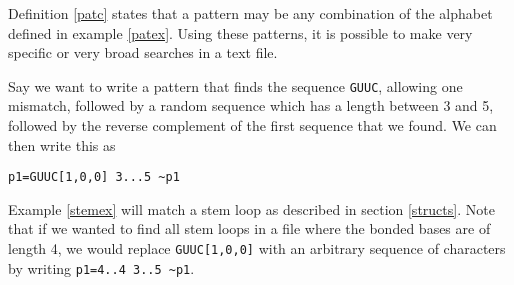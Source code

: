 Definition \ref{patc} states that a pattern may be any combination of the alphabet 
defined in example \ref{patex}.
Using these patterns, it is possible to make very specific or very broad 
searches in a text file. 

\begin{myex}\label{stemex}
Say we want to write a pattern that finds the sequence {\tt GUUC}, allowing 
one mismatch, followed by a random sequence which has a length between 3 and 5, 
followed by the reverse complement of the first sequence that we found. We can 
then write this as \begin{center}
{\tt p1=GUUC[1,0,0] 3...5 \textasciitilde p1}
\end{center}
\end{myex}
Example \ref{stemex} will match a stem loop as described in section 
\ref{structs}. Note that if we wanted to find all stem loops in a file where 
the bonded bases are of length 
4, we would replace {\tt GUUC[1,0,0]} with an arbitrary sequence of characters 
by writing {\tt p1=4..4 3..5 \textasciitilde p1}. 
